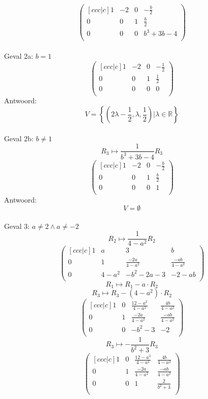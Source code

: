 \documentclass[lineaire_algebra_oplossingen.tex]{subfiles}
\begin{document}
\[
\begin{pmatrix}[ccc|c]
1 & -2 & 0 & -\frac{b}{2}\\
0 & 0 & 1 & \frac{b}{2}\\
0 & 0 & 0 & b^3+3b-4\\
\end{pmatrix}
\]
\\Geval 2a: $b=1$
\[
\begin{pmatrix}[ccc|c]
1 & -2 & 0 & -\frac{1}{2}\\
0 & 0 & 1 & \frac{1}{2}\\
0 & 0 & 0 & 0\\
\end{pmatrix}
\]
Antwoord:
\[
V= \left\lbrace \left(2\lambda-\frac{1}{2},\lambda,\frac{1}{2}\right)| \lambda \in \mathbb{R}\right\rbrace
\]
\\Geval 2b: $b \neq 1$
\[ R_3 \longmapsto \frac{1}{b^3+3b-4}R_3 \]
\[
\begin{pmatrix}[ccc|c]
1 & -2 & 0 & -\frac{b}{2}\\
0 & 0 & 1 & \frac{b}{2}\\
0 & 0 & 0 & 1\\
\end{pmatrix}
\]
Antwoord:
\[
V= \emptyset
\]
\\Geval 3: $a\neq 2 \wedge a \neq -2$ 
\[ R_2 \longmapsto \frac{1}{4-a^{2}}R_2 \]
\[
\begin{pmatrix}[ccc|c]
1 & a & 3 & b\\
0 & 1 & \frac{-2a}{4-a^{2}} & \frac{-ab}{4-a^{2}}\\
0 & 4-a^{2} & -b^{2}-2a-3 & -2-ab\\
\end{pmatrix}
\]
\[ R_1 \longmapsto R_1 - a \cdot R_2 \]
\[ R_3 \longmapsto R_3 - (4-a^{2}) \cdot R_2 \]
\[
\begin{pmatrix}[ccc|c]
1 & 0 & \frac{12-a^{2}}{4-a^{2}} & \frac{4b}{4-a^{2}}\\
0 & 1 & \frac{-2a}{4-a^{2}} & \frac{-ab}{4-a^{2}}\\
0 & 0 & -b^{2}-3 & -2\\
\end{pmatrix}
\]
\[ R_3 \longmapsto -\frac{1}{b^{2}+3}R_3\]
\[
\begin{pmatrix}[ccc|c]
1 & 0 & \frac{12-a^{2}}{4-a^{2}} & \frac{4b}{4-a^{2}}\\
0 & 1 & \frac{-2a}{4-a^{2}} & \frac{-ab}{4-a^{2}}\\
0 & 0 & 1 & \frac{2}{b^{2}+3}\\
\end{pmatrix}
\]
\end{document}
